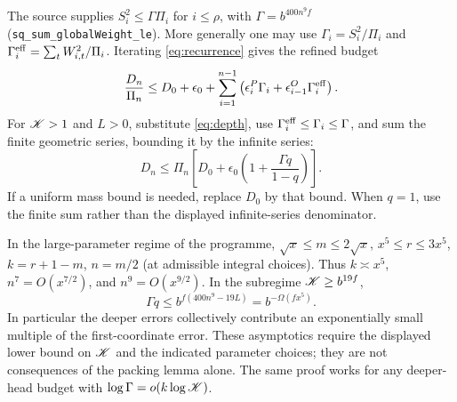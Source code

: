 \documentclass[11pt,a4paper]{article}
\begin{document}
The source supplies $S_i^2\leq \Gamma\Pi_i$ for $i\leq\rho$, with $\Gamma=b^{400n^9f}$ (\texttt{sq\_\allowbreak sum\_\allowbreak globalWeight\_\allowbreak le}). More generally one may use $\Gamma_i=S_i^2/\Pi_i$ and $\Gamma_i^{\rm eff}=\sum_t W_{i,t}^2/\Pi_i$. Iterating \eqref{eq:recurrence} gives the refined budget
\begin{equation}\label{eq:exactrec}
\frac{D_n}{\Pi_n}\leq D_0+\epsilon_0+\sum_{i=1}^{n-1}\left(\epsilon_i^P\Gamma_i+\epsilon_{i-1}^O\Gamma_i^{\rm eff}\right).
\end{equation}
For $\mathscr K>1$ and $L>0$, substitute \eqref{eq:depth}, use $\Gamma_i^{\rm eff}\leq\Gamma_i\leq\Gamma$, and sum the finite geometric series, bounding it by the infinite series:
\begin{equation}\label{eq:dom}
D_n\leq\Pi_n\left[D_0+\epsilon_0\left(1+\frac{\Gamma q}{1-q}\right)\right].
\end{equation}
If a uniform mass bound is needed, replace $D_0$ by that bound. When $q=1$, use the finite sum rather than the displayed infinite-series denominator.

In the large-parameter regime of the programme, $\sqrt{x}\leq m\leq2\sqrt{x}$, $x^5\leq r\leq3x^5$, $k=r+1-m$, $n=m/2$ (at admissible integral choices). Thus $k\asymp x^5$, $n^7=O(x^{7/2})$, and $n^9=O(x^{9/2})$. In the subregime $\mathscr K\geq b^{19f}$,
\[
\Gamma q\leq b^{f(400n^9-19L)}=b^{-\Omega(fx^5)}.
\]
In particular the deeper errors collectively contribute an exponentially small multiple of the first-coordinate error. These asymptotics require the displayed lower bound on $\mathscr K$ and the indicated parameter choices; they are not consequences of the packing lemma alone. The same proof works for any deeper-head budget with $\log\Gamma=o(k\log\mathscr K)$.
\end{document}
